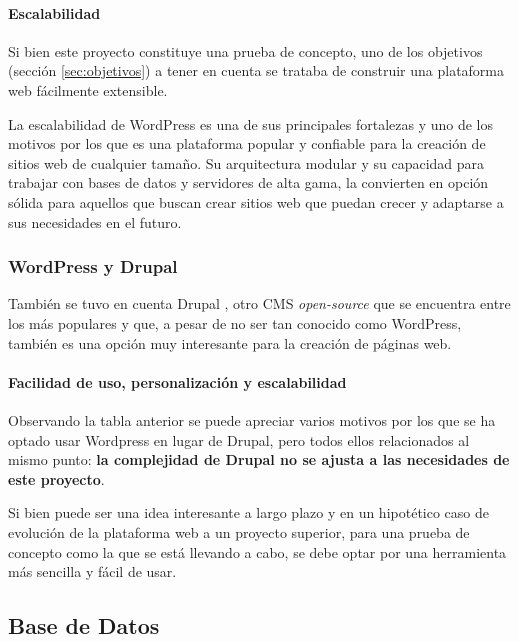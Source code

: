                 \paragraph{Escalabilidad}
                
                    Si bien este proyecto constituye una prueba de concepto, uno de los objetivos (sección \ref{sec:objetivos}) a tener en cuenta se trataba de construir una plataforma web fácilmente extensible.

                    La escalabilidad de WordPress es una de sus principales fortalezas y uno de los motivos por los que es una plataforma popular y confiable para la creación de sitios web de cualquier tamaño. Su arquitectura modular y su capacidad para trabajar con bases de datos y servidores de alta gama, la convierten en opción sólida para aquellos que buscan crear sitios web que puedan crecer y adaptarse a sus necesidades en el futuro.

            \subsubsection{WordPress y Drupal}

                También se tuvo en cuenta Drupal \cite{drupal}, otro CMS \textit{open-source} que se encuentra entre los más populares y que, a pesar de no ser tan conocido como WordPress, también es una opción muy interesante para la creación de páginas web.

                \paragraph{Facilidad de uso, personalización y escalabilidad}
                
                    Observando la tabla anterior se puede apreciar varios motivos por los que se ha optado usar Wordpress en lugar de Drupal, pero todos ellos relacionados al mismo punto: \textbf{la complejidad de Drupal no se ajusta a las necesidades de este proyecto}.
    
                    Si bien puede ser una idea interesante a largo plazo y en un hipotético caso de evolución de la plataforma web a un proyecto superior, para una prueba de concepto como la que se está llevando a cabo, se debe optar por una herramienta más sencilla y fácil de usar.
    
                    \newpage
    
        \subsection{Base de Datos}
        
